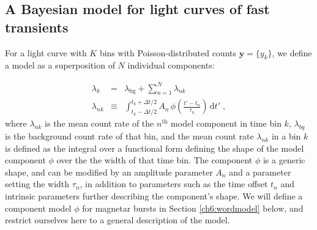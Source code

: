\documentclass[12pt]{emulateapj}
\newcommand{\given}{\,|\,}
\newcommand{\dd}{\mathrm{d}}
\newcommand{\counts}{y}
\newcommand{\pars}{\theta}
\newcommand{\mean}{\lambda}
\newcommand{\Poisson}{{\mathcal P}}
\newcommand{\bg}{\mathrm{bg}}
\newcommand{\word}{\phi}
\begin{document}
\subsection{A Bayesian model for light curves of fast transients}
\label{ch6:model}

For a light curve with $K$ bins with Poisson-distributed counts $\bm{\counts} = \{\counts_k\}$, we define a model as a superposition of $N$ individual components:

\begin{eqnarray}
\mean_k &=& \mean_{\bg} + \sum_{n=1}^N \mean_{nk}
\\
\mean_{nk} &\equiv& \int_{t_k-\Delta t/2}^{t_k+\Delta t/2} A_n\,\word\left(\frac{t'-t_n}{\tau_n}\right)\,\dd t' \; ,
\end{eqnarray}
where $\mean_{nk}$ is the mean count rate of the $n^{\mathrm{th}}$ model component in time bin $k$, 
$\mean_{bg}$ is the background count rate of that bin,
and the mean count rate $\mean_{nk}$ in a bin $k$ is defined as the integral over a functional form defining the shape of
the model component $\word$ over the the width of that time bin. The component $\word$ is a generic shape,
and can be modified by an amplitude parameter $A_n$ and a parameter setting the width $\tau_n$, in addition to
parameters such as the time offset $t_n$ and intrinsic parameters further describing the component's shape.
We will define a component model $\word$ for magnetar bursts in Section \ref{ch6:wordmodel} below, and
restrict ourselves here to a general description of the model.
 
\end{document}
